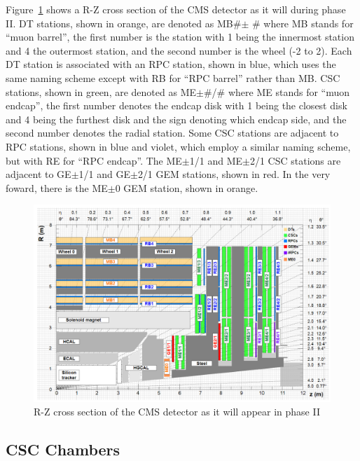 \documentclass[10pt,a4paper]{article}
\begin{document}
Figure~\ref{fig:muonchambers} shows a R-Z cross section of the CMS detector as it will during phase II. DT stations, shown in orange, are denoted as MB\#$\pm$ \# where MB stands for ``muon barrel'', the first number is the station with 1 being the innermost station and 4 the outermost station, and the second number is the wheel (-2 to 2). Each DT station is associated with an RPC station, shown in blue, which uses the same naming scheme except with RB for ``RPC barrel'' rather than MB. CSC stations, shown in green, are denoted as ME$\pm$\#/\# where ME stands for ``muon endcap'', the first number denotes the endcap disk with 1 being the closest disk and 4 being the furthest disk and the sign denoting which endcap side, and the second number denotes the radial station. Some CSC stations are adjacent to RPC stations, shown in blue and violet, which employ a similar naming scheme, but with RE for ``RPC endcap''. The ME$\pm$1/1 and ME$\pm$2/1 CSC stations are adjacent to GE$\pm$1/1 and GE$\pm$2/1 GEM stations, shown in red. In the very foward, there is the ME$\pm$0 GEM station, shown in orange.

\begin{figure}[H]
\centering
\includegraphics[width= 0.8 \textwidth]{figures/muonchambers.png}
\caption{R-Z cross section of the CMS detector as it will appear in phase II}
\label{fig:muonchambers}
\end{figure}

\subsection{CSC Chambers}
\end{document}
